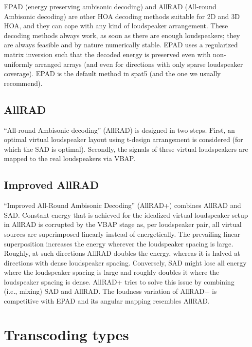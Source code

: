 \documentclass[
  letterpaper,
  DIV=11,
  numbers=noendperiod]{scrreport}
\begin{document}
EPAD (energy preserving ambisonic decoding) and AllRAD (All-round
Ambisonic decoding) are other HOA decoding methods suitable for 2D and
3D HOA, and they can cope with any kind of loudspeaker arrangement.
These decoding methods always work, as soon as there are enough
loudspeakers; they are always feasible and by nature numerically stable.
EPAD uses a regularized matrix inversion such that the decoded energy is
preserved even with non-uniformly arranged arrays (and even for
directions with only sparse loudspeaker coverage). EPAD is the default
method in spat5 (and the one we usually recommend).

\hypertarget{allrad}{%
\subsection{AllRAD}\label{allrad}}

``All-round Ambisonic decoding'' (AllRAD) is designed in two steps.
First, an optimal virtual loudspeaker layout using t-design arrangement
is considered (for which the SAD is optimal). Secondly, the signals of
these virtual loudspeakers are mapped to the real loudspeakers via VBAP.

\hypertarget{improved-allrad}{%
\subsection{Improved AllRAD}\label{improved-allrad}}

``Improved All-Round Ambisonic Decoding'' (AllRAD+) combines AllRAD and
SAD. Constant energy that is achieved for the idealized virtual
loudspeaker setup in AllRAD is corrupted by the VBAP stage as, per
loudspeaker pair, all virtual sources are superimposed linearly instead
of energetically. The prevailing linear superposition increases the
energy wherever the loudspeaker spacing is large. Roughly, at such
directions AllRAD doubles the energy, whereas it is halved at directions
with dense loudspeaker spacing. Conversely, SAD might lose all energy
where the loudspeaker spacing is large and roughly doubles it where the
loudspeaker spacing is dense. AllRAD+ tries to solve this issue by
combining (i.e., mixing) SAD and AllRAD. The loudness variation of
AllRAD+ is competitive with EPAD and its angular mapping resembles
AllRAD.

\hypertarget{transcoding-types}{%
\section{Transcoding types}\label{transcoding-types}}
\end{document}
